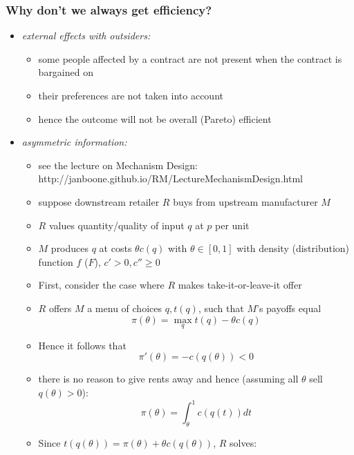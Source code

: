 \documentclass[11pt,english]{beamer}
\begin{document}
\begin{frame}[allowframebreaks]\frametitle{Why don't we always get efficiency?}

  \begin{itemize}
  \item \emph{external effects with outsiders:}
    \begin{itemize}
    \item some people affected by a contract are not present when the
      contract is bargained on
    \item their preferences are not taken into account
    \item hence the outcome will not be overall (Pareto) efficient
    \end{itemize}
  \item \emph{asymmetric information:}
    \begin{itemize}
    \item see the lecture on Mechanism Design: http://janboone.github.io/RM/LectureMechanismDesign.html
    \item suppose downstream retailer $R$ buys from upstream
      manufacturer $M$
    \item $R$ values quantity/quality of input $q$ at $p$ per unit
    \item $M$ produces $q$ at costs $\theta c(q)$ with $\theta \in
      [0,1]$ with density (distribution) function $f$ ($F$), $c'>0,c''
      \geq 0$
    \item First, consider the case where $R$ makes take-it-or-leave-it
      offer
    \item $R$ offers $M$ a menu of choices $q,t(q)$, such that $M$'s
      payoffs equal
      \begin{equation*}
        \pi(\theta) = \max_q t(q)-\theta c(q)
      \end{equation*}
    \item Hence it follows that
    \begin{equation}
      \label{eq:ICasyminfo}
      \pi'(\theta) = -c(q(\theta)) <0
    \end{equation}
  \item there is no reason to give rents away and hence (assuming all
    $\theta$ sell $q(\theta)>0$):
    \begin{equation*}
      \pi(\theta) = \int_{\theta}^1 c(q(t))dt
    \end{equation*}
  \item Since $t(q(\theta))=\pi(\theta)+\theta c(q(\theta))$, $R$ solves:
    \begin{equation*}

\end{equation*}
\end{itemize}
\end{itemize}
\end{frame}
\end{document}
